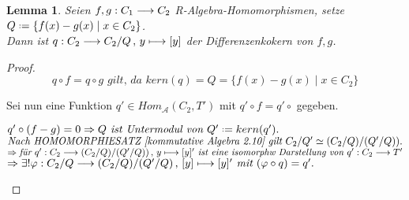 \documentclass[10pt,a4paper]{report}
\newcounter{Aussage}[chapter]
\newtheorem{lemma}[Aussage]{Lemma}
\newcommand{\functionfront}[3]{\nolinebreak{#1:#2 \longrightarrow #3}}
\newcommand{\function}[5]{\nolinebreak{#1:#2 \longrightarrow #3 \, , \, #4 \longmapsto #5}}
\newcommand*{\defeq}{\mathrel{\vcenter{\baselineskip0.5ex \lineskiplimit0pt
                     \hbox{\scriptsize.}\hbox{\scriptsize.}}}%
                     =}
\newcommand{\kernel}[1]{kern(#1)}
\begin{document}
\begin{lemma}
Seien $\functionfront{f,g}{C_1}{C_2}$ R-Algebra-Homomorphismen, setze $Q \defeq \lbrace f(x) - g(x)\mid x \in C_2 \rbrace$.\\
Dann ist $\function{q}{C_2}{C_2/Q}{y}{[y]}$ der Differenzenkokern von $f,g$.
\end{lemma}
\begin{proof}
$$q \circ f = q \circ g \textit{ gilt, da } \kernel{q} = Q = \lbrace f(x) - g(x)\mid x \in C_2 \rbrace$$

Sei nun eine Funktion $q' \in Hom_{\mathcal{A}}(C_2,T')$ mit $q' \circ f = q' \circ$ gegeben.
\begin{spacing}{1.5}
$q' \circ (f - g) = 0 \Rightarrow Q\textit{ ist Untermodul von }Q' \defeq \kernel{q'}.$\\
$\textit{Nach HOMOMORPHIESATZ [kommutative Algebra 2.10] gilt } \nolinebreak{C_2/Q' \simeq (C_2/Q)/(Q'/Q))}.$\\
$\Rightarrow \textit{für } \function{q'}{C_2}{(C_2/Q)/(Q'/Q))}{y}{[y]'} \textit{ ist eine isomorphw Darstellung von } \functionfront{q'}{C_2}{T'}$\\
$\Rightarrow \exists ! \function{\varphi}{C_2/Q}{(C_2/Q)/(Q'/Q)}{[y]}{[y]'}\textit{ mit }(\varphi \circ q) = q'.$
\end{spacing}
\end{proof}
\end{document}
